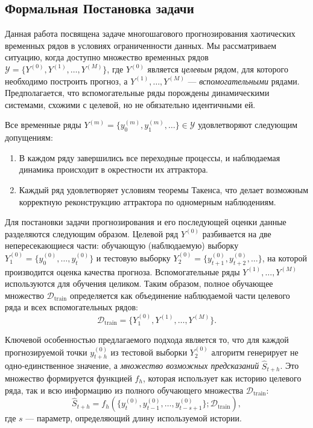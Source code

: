 \subsection{Формальная Постановка задачи}

Данная работа посвящена задаче многошагового прогнозирования хаотических
 временных рядов в условиях ограниченности данных. Мы рассматриваем ситуацию,
  когда доступно множество временных рядов $\mathcal{Y} = \{Y^{(0)}, Y^{(1)},
   \dots, Y^{(M)}\}$, где $Y^{(0)}$ является \textit{целевым} рядом, для которого
    необходимо построить прогноз, а $Y^{(1)}, \dots, Y^{(M)}$ — \textit{вспомогательными} рядами.
     Предполагается, что вспомогательные ряды порождены динамическими системами,
      схожими с целевой, но не обязательно идентичными ей.

Все временные ряды $Y^{(m)} = \{y_0^{(m)}, y_1^{(m)}, \dots\} \in \mathcal{Y}$ удовлетворяют следующим допущениям:
\begin{enumerate}
    \item В каждом ряду завершились все переходные процессы, и наблюдаемая
    динамика происходит в окрестности их аттрактора.
    \item Каждый ряд удовлетворяет условиям теоремы Такенса\cite{Takens1981}, что делает
    возможным корректную реконструкцию аттрактора по одномерным наблюдениям.
\end{enumerate}

Для постановки задачи прогнозирования и его последующей оценки данные разделяются
 следующим образом. Целевой ряд $Y^{(0)}$ разбивается на две непересекающиеся части:
  обучающую (наблюдаемую) выборку $Y_1^{(0)} = \{y_0^{(0)}, \dots, y_t^{(0)}\}$ и
   тестовую выборку $Y_2^{(0)} = \{y_{t+1}^{(0)}, y_{t+2}^{(0)}, \dots\}$, на которой
    производится оценка качества прогноза. Вспомогательные ряды $Y^{(1)}, \dots, Y^{(M)}$
     используются для обучения целиком. Таким образом, полное обучающее множество
     $\mathcal{D}_{\text{train}}$ определяется как объединение наблюдаемой части
      целевого ряда и всех вспомогательных рядов:
\[
\mathcal{D}_{\text{train}} = \{Y_1^{(0)}, Y^{(1)}, \dots, Y^{(M)}\}.
\]

Ключевой особенностью предлагаемого подхода является то, что для каждой
 прогнозируемой точки $y_{t+h}^{(0)}$ из тестовой выборки $Y_2^{(0)}$ алгоритм
  генерирует не одно-единственное значение, а \textit{множество возможных предсказаний}
   $\hat{S}_{t+h}$. Это множество формируется функцией $f_h$, которая использует
   как историю целевого ряда, так и всю информацию из полного обучающего множества $\mathcal{D}_{\text{train}}$:
\[
\hat{S}_{t+h} = f_h\left(\{y_t^{(0)}, y_{t-1}^{(0)}, \dots, y_{t-s+1}^{(0)}\}; \mathcal{D}_{\text{train}}\right),
\]
где $s$ — параметр, определяющий длину используемой истории.

